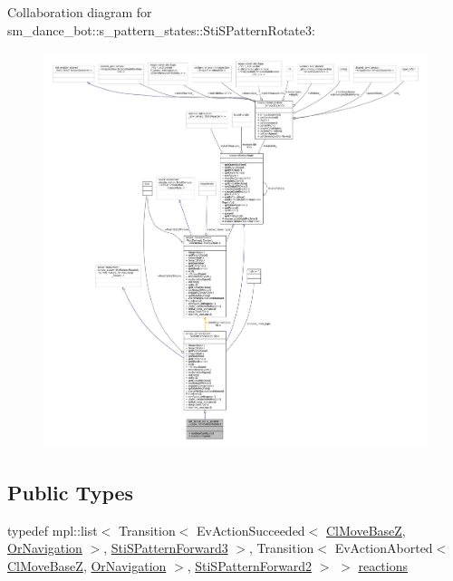 Collaboration diagram for sm\+\_\+dance\+\_\+bot\+:\+:s\+\_\+pattern\+\_\+states\+:\+:Sti\+S\+Pattern\+Rotate3\+:
\nopagebreak
\begin{figure}[H]
\begin{center}
\leavevmode
\includegraphics[width=350pt]{structsm__dance__bot_1_1s__pattern__states_1_1StiSPatternRotate3__coll__graph}
\end{center}
\end{figure}
\subsection*{Public Types}
\begin{DoxyCompactItemize}
\item 
typedef mpl\+::list$<$ Transition$<$ Ev\+Action\+Succeeded$<$ \hyperlink{classmove__base__z__client_1_1ClMoveBaseZ}{Cl\+Move\+BaseZ}, \hyperlink{classsm__dance__bot_1_1OrNavigation}{Or\+Navigation} $>$, \hyperlink{structsm__dance__bot_1_1s__pattern__states_1_1StiSPatternForward3}{Sti\+S\+Pattern\+Forward3} $>$, Transition$<$ Ev\+Action\+Aborted$<$ \hyperlink{classmove__base__z__client_1_1ClMoveBaseZ}{Cl\+Move\+BaseZ}, \hyperlink{classsm__dance__bot_1_1OrNavigation}{Or\+Navigation} $>$, \hyperlink{structsm__dance__bot_1_1s__pattern__states_1_1StiSPatternForward2}{Sti\+S\+Pattern\+Forward2} $>$ $>$ \hyperlink{structsm__dance__bot_1_1s__pattern__states_1_1StiSPatternRotate3_a8f8dc6114070de47e9c2eedbb9f3ccb7}{reactions}
\end{DoxyCompactItemize}
